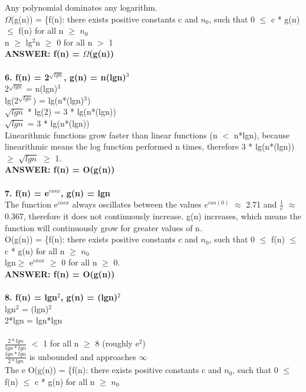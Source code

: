 \documentclass[fleqn]{article}
\begin{document}
Any polynomial dominates any logarithm.\\
$\Omega$(g(n)) = \{f(n): there exists positive constants c and  $n_{0}$, such that 0 $\le$ c * g(n) $\le$ f(n) for all n $\ge$ $n_{0}$\\
n $\ge$ lg$^{2}$n $\ge$ 0 for all n $>$ 1\\
\textbf{ANSWER: f(n) = $\Omega$(g(n))}\\\\
\textbf{6. f(n) = 2$^{\sqrt{lgn}}$, g(n) = n(lgn)$^{3}$}\\
2$^{\sqrt{lgn}}$ = n(lgn)$^{3}$ \\
lg(2$^{\sqrt{lgn}}$) = lg(n*(lgn)$^{3}$)\\
$\sqrt{lgn}$ * lg(2) = 3 * lg(n*(lgn))\\
$\sqrt{lgn}$ = 3 * lg(n*(lgn))\\
Linearithmic functions grow faster than linear functions (n $<$ n*lgn),  because linearithmic means the log function performed n times, therefore 3 * lg(n*(lgn)) $\ge$ $\sqrt{lgn}$ $\ge$ 1.\\
\textbf{ANSWER: f(n) = O(g(n))}\\\\
\textbf{7. f(n) = e$^{cosx}$, g(n) = lgn}\\
The function e$^{cosx}$ always oscillates between the values $e^{cos(0)}$ $\approx$ 2.71 and $\frac{1}{e}$ $\approx$ 0.367, therefore it does not continuously increase. g(n) increases, which means the function will continuously grow for greater values of n.\\
O(g(n)) = \{f(n): there exists positive constants c and  $n_{0}$, such that 0 $\le$ f(n) $\le$ c * g(n) for all n $\ge$ $n_{0}$\\
lgn$\ge$ e$^{cosx}$ $\ge$ 0 for all n $\ge$ 0.\\
\textbf{ANSWER: f(n) = O(g(n))}\\\\
\textbf{8. f(n) = lgn$^{2}$, g(n) = (lgn)$^{2}$}\\
lgn$^{2}$ = (lgn)$^{2}$\\
2*lgn = lgn*lgn\\\\
$\frac{2*lgn}{lgn*lgn}$ $<$ 1 for all n $\ge$ 8 (roughly e$^{2}$)\\
$\frac{lgn*lgn}{2*lgn}$ is unbounded and approaches $\infty$\\
The e
O(g(n)) = \{f(n): there exists positive constants c and  $n_{0}$, such that 0 $\le$ f(n) $\le$ c * g(n) for all n $\ge$ $n_{0}$\\
\end{document}
